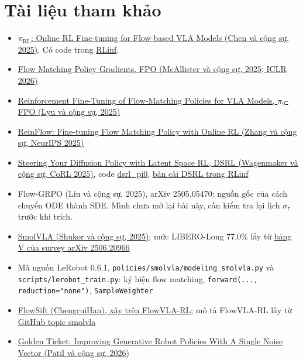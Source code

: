 \documentclass[11pt,a4paper]{article}
\newcommand{\code}[1]{\texttt{#1}}
\begin{document}
\section*{Tài liệu tham khảo}
\begingroup\raggedright
\begin{itemize}
  \item \href{https://arxiv.org/abs/2510.25889}{$\pi_{\text{RL}}$: Online RL Fine-tuning for Flow-based VLA Models (Chen và cộng sự, 2025)}. Có code trong \href{https://github.com/RLinf/RLinf}{RLinf}.
  \item \href{https://arxiv.org/abs/2507.21053}{Flow Matching Policy Gradients, FPO (McAllister và cộng sự, 2025; ICLR 2026)}
  \item \href{https://arxiv.org/abs/2510.09976}{Reinforcement Fine-Tuning of Flow-Matching Policies for VLA Models, $\pi_0$-FPO (Lyu và cộng sự, 2025)}
  \item \href{https://arxiv.org/abs/2505.22094}{ReinFlow: Fine-tuning Flow Matching Policy with Online RL (Zhang và cộng sự, NeurIPS 2025)}
  \item \href{https://arxiv.org/abs/2506.15799}{Steering Your Diffusion Policy with Latent Space RL, DSRL (Wagenmaker và cộng sự, CoRL 2025)}, code \href{https://github.com/nakamotoo/dsrl_pi0}{dsrl\_pi0}, \href{https://rlinf.readthedocs.io/en/latest/rst_source/examples/embodied/dsrl.html}{bản cài DSRL trong RLinf}
  \item Flow-GRPO (Liu và cộng sự, 2025), arXiv 2505.05470: nguồn gốc của cách chuyển ODE thành SDE. Mình chưa mở lại bài này, cần kiểm tra lại lịch $\sigma_\tau$ trước khi trích.
  \item \href{https://arxiv.org/abs/2506.01844}{SmolVLA (Shukor và cộng sự, 2025)}; mức LIBERO-Long 77,0\% lấy từ \href{https://arxiv.org/pdf/2506.20966}{bảng V của survey arXiv 2506.20966}
  \item Mã nguồn LeRobot 0.6.1, \code{policies/smolvla/modeling\_smolvla.py} và \code{scripts/lerobot\_train.py}: ký hiệu flow matching, \code{forward(..., reduction="none")}, \code{SampleWeighter}
  \item \href{https://github.com/ChengruiHan/FlowSift}{FlowSift (ChengruiHan), xây trên FlowVLA-RL}; mô tả FlowVLA-RL lấy từ \href{https://github.com/topics/smolvla}{GitHub topic smolvla}
  \item \href{https://arxiv.org/abs/2603.15757}{Golden Ticket: Improving Generative Robot Policies With A Single Noise Vector (Patil và cộng sự, 2026)}
\end{itemize}
\endgroup
\end{document}
